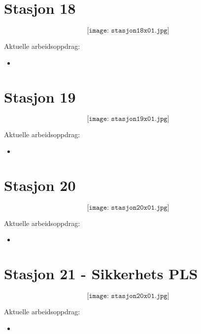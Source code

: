 \section{Stasjon 18}

$$\texttt{[image: stasjon18x01.jpg]}$$

Aktuelle arbeidsoppdrag:\\
\begin{itemize}[noitemsep]
	\item 
\end{itemize}

\section{Stasjon 19}

$$\texttt{[image: stasjon19x01.jpg]}$$

Aktuelle arbeidsoppdrag:\\
\begin{itemize}[noitemsep]
	\item 
\end{itemize}


\section{Stasjon 20}

$$\texttt{[image: stasjon20x01.jpg]}$$

Aktuelle arbeidsoppdrag:\\
\begin{itemize}[noitemsep]
	\item 
\end{itemize}

\section{Stasjon 21 - Sikkerhets PLS}

$$\texttt{[image: stasjon20x01.jpg]}$$

Aktuelle arbeidsoppdrag:\\
\begin{itemize}[noitemsep]
	\item 
\end{itemize}











































